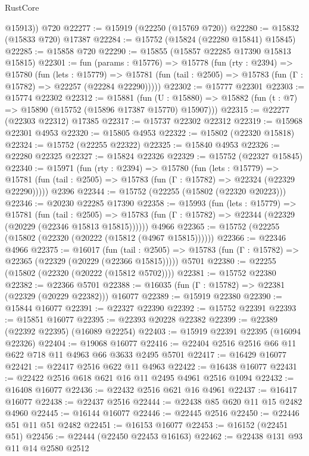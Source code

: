 \begin{lexlean}{RustCore}
\begin{coremodule}
        @15913))
    @720
@22277 := @15919 (@22250 (@15769 @720))
@22280 := @15832 (@15833 @720) @17387
@22284 := @15752 (@15824 (@22280 @15841) @15845)
@22285 := @15858 @720
@22290 := @15855 (@15857 @22285 @17390 @15813 @15815)
@22301 := fun (params : @15776) =>
  @15778
    (fun (rty : @2394) =>
    @15780
      (fun (lets : @15779) =>
      @15781 (fun (tail : @2505) => @15783 (fun (Γ : @15782) => @22257 (@22284 @22290)))))
@22302 := @15777 @22301
@22303 := @15774 @22302
@22312 := @15881
    (fun (U : @15880) => @15882 (fun (t : @7) => @15890 (@15752 (@15896 @17387 @15770) @15907)))
@22315 := @22277 (@22303 @22312) @17385
@22317 := @15737 @22302 @22312
@22319 := @15968 @22301 @4953
@22320 := @15805 @4953
@22322 := @15802 (@22320 @15818)
@22324 := @15752 (@22255 @22322)
@22325 := @15840 @4953
@22326 := @22280 @22325
@22327 := @15824 @22326
@22329 := @15752 (@22327 @15845)
@22340 := @15971
    (fun (rty : @2394) =>
    @15780
      (fun (lets : @15779) =>
      @15781 (fun (tail : @2505) => @15783 (fun (Γ : @15782) => @22324 (@22329 @22290)))))
    @2396
@22344 := @15752 (@22255 (@15802 (@22320 @20223)))
@22346 := @20230 @22285 @17390
@22358 := @15993
    (fun (lets : @15779) =>
    @15781
      (fun (tail : @2505) =>
      @15783 (fun (Γ : @15782) => @22344 (@22329 (@20229 (@22346 @15813 @15815))))))
    @4966
@22365 := @15752 (@22255 (@15802 (@22320 (@20222 (@15812 (@4967 @15815))))))
@22366 := @22346 @4966
@22375 := @16017
    (fun (tail : @2505) => @15783 (fun (Γ : @15782) => @22365 (@22329 (@20229 (@22366 @15815)))))
    @5701
@22380 := @22255 (@15802 (@22320 (@20222 (@15812 @5702))))
@22381 := @15752 @22380
@22382 := @22366 @5701
@22388 := @16035 (fun (Γ : @15782) => @22381 (@22329 (@20229 @22382))) @16077
@22389 := @15919 @22380
@22390 := @15844 @16077
@22391 := @22327 @22390
@22392 := @15752 @22391
@22393 := @15851 @16077
@22395 := @22393 @20228 @22382
@22399 := @22389 (@22392 @22395) (@16089 @22254)
@22403 := @15919 @22391 @22395 (@16094 @22326)
@22404 := @19068 @16077
@22416 := @22404 @2516 @2516 @66 @11 @622 @718 @11 @4963 @66 @3633 @2495 @5701
@22417 := @16429 @16077
@22421 := @22417 @2516 @622 @11 @4963
@22422 := @16438 @16077
@22431 := @22422 @2516 @618 @621 @16 @11 @2495 @4961 @2516 @1094
@22432 := @16408 @16077
@22436 := @22432 @2516 @621 @16 @4961
@22437 := @16417 @16077
@22438 := @22437 @2516
@22444 := @22438 @85 @620 @11 @15 @2482 @4960
@22445 := @16144 @16077
@22446 := @22445 @2516
@22450 := @22446 @51 @11 @51 @2482
@22451 := @16153 @16077
@22453 := @16152 (@22451 @51)
@22456 := @22444 (@22450 @22453 @16163)
@22462 := @22438 @131 @93 @11 @14 @2580 @2512

\end{coremodule}
\end{lexlean}
